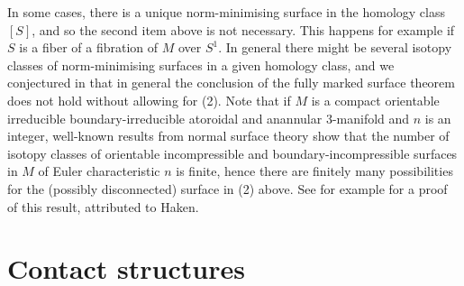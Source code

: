 \documentclass[11pt]{amsart}
\theoremstyle{remark}
\theoremstyle{definition}
\begin{document}
	In some cases, there is a unique norm-minimising surface in the homology class $[S]$, and so the second item above is not necessary. This happens for example if $S$ is a fiber of a fibration of $M$ over $S^1$. In general there might be several isotopy classes of norm-minimising surfaces in a given homology class, and we conjectured in \cite{gabai2020fullymarked} that in general the conclusion of the fully marked surface theorem does not hold without allowing for (2).  Note that if $M$ is a compact orientable irreducible boundary-irreducible atoroidal and anannular 3-manifold and $n$ is an integer, well-known results from normal surface theory show that the number of isotopy classes of orientable incompressible and boundary-incompressible surfaces in $M$ of Euler characteristic $n$ is finite, hence there are finitely many possibilities for the (possibly disconnected) surface in (2) above. See for example \cite{oertel2002existence} for a proof of this result, attributed to Haken. 
	
	
	\section{Contact structures}
	
	\label{sec: contact structures}
	
\end{document}
